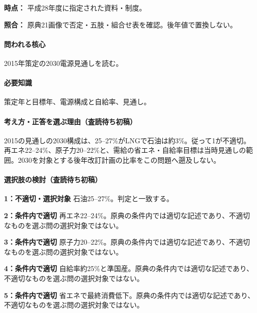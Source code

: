 \noindent\textbf{時点：} 平成28年度に指定された資料・制度。\par

\noindent\textbf{照合：} 原典21画像で否定・五肢・組合せ表を確認。後年値で置換しない。\par

\paragraph{問われる核心} 2015年策定の2030電源見通しを読む。

\paragraph{必要知識} 策定年と目標年、電源構成と自給率、見通し。

\paragraph{考え方・正答を選ぶ理由（査読待ち初稿）} 2015の見通しの2030構成は、25–27\%がLNGで石油は約3\%。従って1が不適切。再エネ22–24\%、原子力20–22\%と、需給の省エネ・自給率目標は当時見通しの範囲。2030を対象とする後年改訂計画の比率をこの問題へ遡及しない。

\paragraph{選択肢の検討（査読待ち初稿）}\mbox{}\par

\noindent\textbf{1：不適切・選択対象} 石油25–27\%。判定と一致する。\par

\noindent\textbf{2：条件内で適切} 再エネ22–24\%。原典の条件内では適切な記述であり、不適切なものを選ぶ問の選択対象ではない。\par

\noindent\textbf{3：条件内で適切} 原子力20–22\%。原典の条件内では適切な記述であり、不適切なものを選ぶ問の選択対象ではない。\par

\noindent\textbf{4：条件内で適切} 自給率約25\%と準国産。原典の条件内では適切な記述であり、不適切なものを選ぶ問の選択対象ではない。\par

\noindent\textbf{5：条件内で適切} 省エネで最終消費低下。原典の条件内では適切な記述であり、不適切なものを選ぶ問の選択対象ではない。\par

